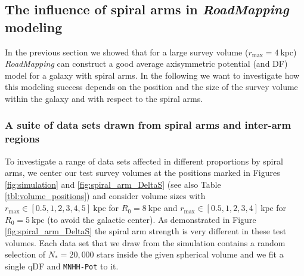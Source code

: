 \documentclass[iop,revtex4,numberedappendix,appendixfloats]{emulateapj}
\newcommand{\RM}{{\sl RoadMapping}}
\newcommand{\hiddenComment}[1]{}
\begin{document}
\hiddenComment{[TO DO: Jo writes: "If you make the equivalent of Figure 7 for fits that are especially good and those that are especially bad, is the difference between the qDF prediction and the data that went into the analysis very different? If so, that might be nice to point out and then say that we will investigate this in later work." $\longrightarrow$ I should do this as part of the review process.]}

\subsection{The influence of spiral arms in \RM{} modeling} \label{sec:results_part2}

In the previous section we showed that for a large survey volume ($r_\text{max}=4~\text{kpc}$) \RM{} can construct a good average axisymmetric potential (and DF) model for a galaxy with spiral arms. In the following we want to investigate how this modeling success depends on the position and the size of the survey volume within the galaxy and with respect to the spiral arms.

\subsubsection{A suite of data sets drawn from spiral arms and inter-arm regions} \label{sec:suite}

To investigate a range of data sets affected in different proportions by spiral arms, we center our test survey volumes at the positions marked in Figures \ref{fig:simulation} and \ref{fig:spiral_arm_DeltaS} (see also Table \ref{tbl:volume_positions}) and consider volume sizes with $r_\text{max} \in [0.5,1,2,3,4,5]~\text{kpc}$ for $R_0 = 8~\text{kpc}$ and $r_\text{max} \in [0.5,1,2,3,4]~\text{kpc}$ for $R_0 = 5~\text{kpc}$ (to avoid the galactic center). As demonstrated in Figure \ref{fig:spiral_arm_DeltaS} the spiral arm strength is very different in these test volumes. Each data set that we draw from the simulation contains a random selection of $N_*=20,000$ stars inside the given spherical volume and we fit a single qDF and \texttt{MNHH-Pot} to it. 
\end{document}
